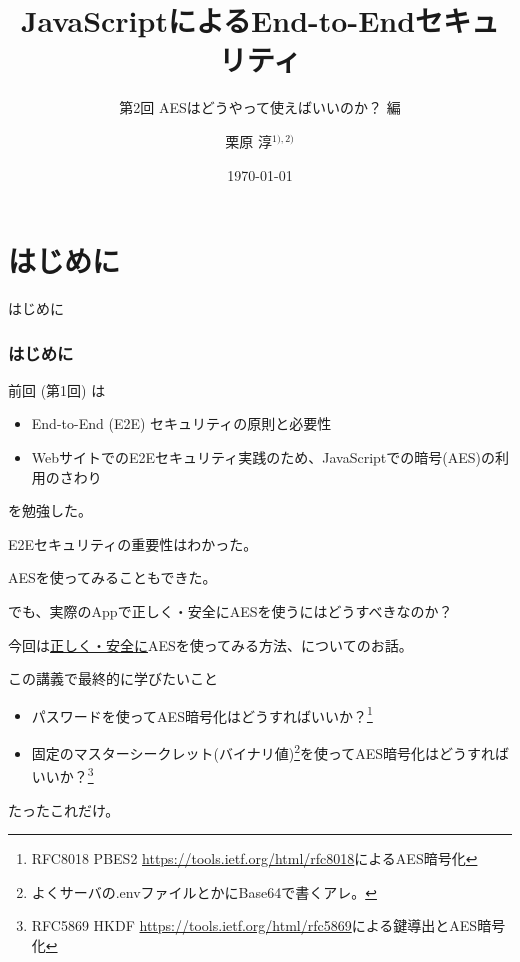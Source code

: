 \documentclass[12pt,dvipdfmx]{beamer}
\title[E2E Security with JS 02]{JavaScriptによるEnd-to-Endセキュリティ}
\subtitle{第2回 AESはどうやって使えばいいのか？ 編}
\author[Jun Kurihara]{栗原 淳$^{1),2)}$}
\institute[Zettant Inc./U-Hyogo]{$^{1)}$株式会社ゼタント\\ $^{2)}$兵庫県立大学}
\date[\today]{\today}
\begin{document}
\begin{frame}
\titlepage
\end{frame}

\section{はじめに}
\begin{frame}
 \centering
 {\Large はじめに}
\end{frame}

\begin{frame}
\frametitle{はじめに}
前回 (第1回) は
\begin{itemize}
 \item End-to-End (E2E) セキュリティの原則と必要性
 \item WebサイトでのE2Eセキュリティ実践のため、JavaScriptでの暗号(AES)の利用のさわり
\end{itemize}
を勉強した。

\vspace{2ex}

E2Eセキュリティの重要性はわかった。

AESを使ってみることもできた。

\vspace{2ex}

でも、実際のAppで\alert{正しく・安全にAESを使うにはどうすべきなのか？}
\end{frame}

\begin{frame}
今回は\underline{正しく・安全に}AESを使ってみる方法、についてのお話。

\begin{block}{\small この講義で最終的に学びたいこと}
\begin{itemize}
\item パスワードを使ってAES暗号化はどうすればいいか？\footnote[frame]{\scriptsize RFC8018 PBES2 \url{https://tools.ietf.org/html/rfc8018}によるAES暗号化}
\item 固定のマスターシークレット(バイナリ値)\footnote[frame]{\scriptsize よくサーバの.envファイルとかにBase64で書くアレ。}を使ってAES暗号化はどうすればいいか？\footnote[frame]{\scriptsize RFC5869 HKDF \url{https://tools.ietf.org/html/rfc5869}による鍵導出とAES暗号化}
\end{itemize}
\end{block}

\vspace{2ex}

たったこれだけ。

\end{frame}
\end{document}
